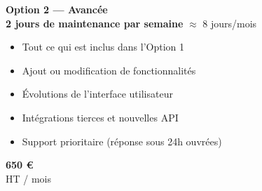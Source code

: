 \documentclass[a4paper,11pt]{article}
\begin{document}
\colorbox{primary!8}{\parbox{\textwidth}{
  \vspace{6pt}
  \begin{minipage}{0.72\textwidth}
    \textbf{\color{primary}\large Option 2 — Avancée} \\[3pt]
    \textbf{2 jours de maintenance par semaine} $\approx$ 8 jours/mois\\[4pt]
    \begin{itemize}[leftmargin=*, noitemsep, topsep=2pt]
      \item Tout ce qui est inclus dans l'Option 1
      \item Ajout ou modification de fonctionnalités
      \item Évolutions de l'interface utilisateur
      \item Intégrations tierces et nouvelles API
      \item Support prioritaire (réponse sous 24h ouvrées)
    \end{itemize}
  \end{minipage}
  \hfill
  \begin{minipage}{0.24\textwidth}
    \centering
    \colorbox{accent}{\parbox{0.9\textwidth}{
      \centering\color{white}\vspace{4pt}
      {\large\bfseries 650 €}\\{\small HT / mois}
      \vspace{4pt}
    }}
  \end{minipage}
  \vspace{6pt}
}}

\vspace{6pt}
\end{document}
